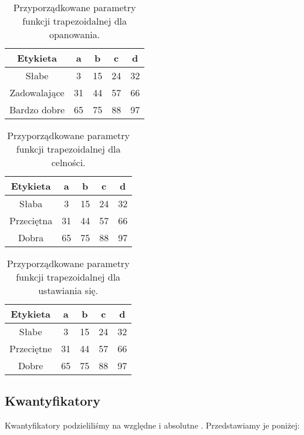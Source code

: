 \documentclass{classrep}
\begin{document}
\begin{table}[H]
	\centering
	\begin{tabular}{c c c c c} 
		\hline
		\textbf{Etykieta} & \textbf{a} & \textbf{b} & \textbf{c} &  \textbf{d} \\ [0.5ex] 
		\hline
		\hline 
		Słabe & 3 & 15 & 24 & 32 \\ 
		Zadowalające & 31 & 44 & 57 & 66 \\
		Bardzo dobre & 65 & 75 & 88 & 97 \\
		\hline
	\end{tabular}
	\caption{Przyporządkowane parametry funkcji trapezoidalnej dla opanowania.}
\end{table}

\begin{table}[H]
	\centering
	\begin{tabular}{c c c c c} 
		\hline
		\textbf{Etykieta} & \textbf{a} & \textbf{b} & \textbf{c} &  \textbf{d} \\ [0.5ex] 
		\hline
		\hline 
		Słaba & 3 & 15 & 24 & 32 \\ 
		Przeciętna & 31 & 44 & 57 & 66 \\
		Dobra & 65 & 75 & 88 & 97 \\
		\hline
	\end{tabular}
	\caption{Przyporządkowane parametry funkcji trapezoidalnej dla celności.}
\end{table}

\begin{table}[H]
	\centering
	\begin{tabular}{c c c c c} 
		\hline
		\textbf{Etykieta} & \textbf{a} & \textbf{b} & \textbf{c} &  \textbf{d} \\ [0.5ex] 
		\hline
		\hline 
		Słabe & 3 & 15 & 24 & 32 \\ 
		Przeciętne & 31 & 44 & 57 & 66 \\
		Dobre & 65 & 75 & 88 & 97 \\
		\hline
	\end{tabular}
	\caption{Przyporządkowane parametry funkcji trapezoidalnej dla ustawiania się.}
\end{table}

\subsection{Kwantyfikatory}
Kwantyfikatory podzieliliśmy na względne i absolutne . Przedstawiamy je poniżej:
\end{document}
